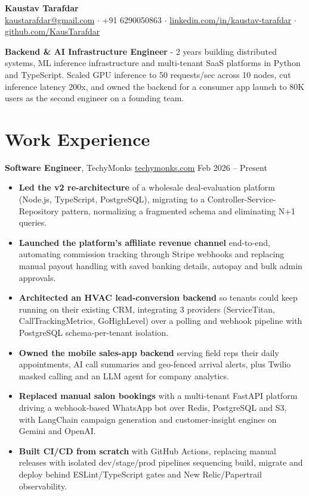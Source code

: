 \documentclass[10pt,a4paper]{article}
\newcommand{\experience}[5]{
    \vspace{0.25em}
    \noindent\textbf{#2}, #1 \; \href{#4}{\small #5} \hfill #3\par
    \vspace{0.1em}
}
\begin{document}
\begin{center}
{\LARGE\bfseries Kaustav Tarafdar}\\[0.15em]
\href{mailto:kaustarafdar@gmail.com}{kaustarafdar@gmail.com} $\cdot$
+91 6290050863 $\cdot$
\href{https://linkedin.com/in/kaustav-tarafdar}{linkedin.com/in/kaustav-tarafdar} $\cdot$
\href{https://github.com/KausTarafdar}{github.com/KausTarafdar}
\end{center}

\vspace{0.15em}
\noindent\textbf{Backend \& AI Infrastructure Engineer} - 2 years building distributed systems, ML inference infrastructure and multi-tenant SaaS platforms in Python and TypeScript. Scaled GPU inference to 50 requests/sec across 10 nodes, cut inference latency 200x, and owned the backend for a consumer app launch to 80K users as the second engineer on a founding team.

\section*{Work Experience}

\experience
{TechyMonks}
{Software Engineer}
{Feb 2026 -- Present}
{https://www.techymonks.com/}
{techymonks.com}

\begin{itemize}[leftmargin=*,nosep]
\item \textbf{Led the v2 re-architecture} of a wholesale deal-evaluation platform (Node.js, TypeScript, PostgreSQL), migrating to a Controller-Service-Repository pattern, normalizing a fragmented schema and eliminating N+1 queries.
\item \textbf{Launched the platform's affiliate revenue channel} end-to-end, automating commission tracking through Stripe webhooks and replacing manual payout handling with saved banking details, autopay and bulk admin approvals.
\item \textbf{Architected an HVAC lead-conversion backend} so tenants could keep running on their existing CRM, integrating 3 providers (ServiceTitan, CallTrackingMetrics, GoHighLevel) over a polling and webhook pipeline with PostgreSQL schema-per-tenant isolation.
\item \textbf{Owned the mobile sales-app backend} serving field reps their daily appointments, AI call summaries and geo-fenced arrival alerts, plus Twilio masked calling and an LLM agent for company analytics.
\item \textbf{Replaced manual salon bookings} with a multi-tenant FastAPI platform driving a webhook-based WhatsApp bot over Redis, PostgreSQL and S3, with LangChain campaign generation and customer-insight engines on Gemini and OpenAI.
\item \textbf{Built CI/CD from scratch} with GitHub Actions, replacing manual releases with isolated dev/stage/prod pipelines sequencing build, migrate and deploy behind ESLint/TypeScript gates and New Relic/Papertrail observability.
\end{itemize}
\end{document}
